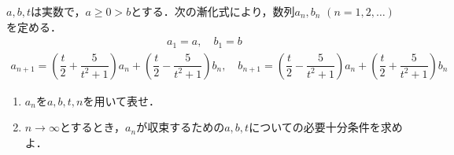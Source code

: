 \documentclass[../../main.tex]{subfiles}
\begin{document}
$a, b, t$は実数で，$a \ge 0 > b$とする．次の漸化式により，数列$a_n, b_n$ $(n=1, 2, \dots)$を定める．
\begin{align}
  a_1=a, \quad b_1=b
\end{align}
\begin{align}
  a_{n+1} = \left(\dfrac{t}{2} + \dfrac{5}{t^2+1}\right) a_n + \left(\dfrac{t}{2} - \dfrac{5}{t^2+1}\right) b_n, \quad b_{n+1} = \left(\dfrac{t}{2} - \dfrac{5}{t^2+1}\right) a_n + \left(\dfrac{t}{2} + \dfrac{5}{t^2+1}\right) b_n
\end{align}
\begin{enumerate}
  \item $a_n$を$a, b, t, n$を用いて表せ．
  \item $n \to \infty$とするとき，$a_n$が収束するための$a, b, t$についての必要十分条件を求めよ．
\end{enumerate}
\end{document}
